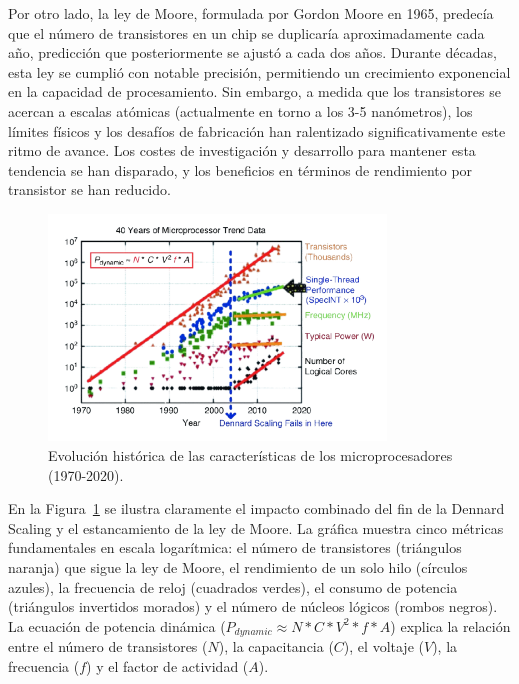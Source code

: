 \documentclass[11pt,spanish,listoffigures,listoftables]{tfgetsinf}
\begin{document}
Por otro lado, la ley de Moore, formulada por Gordon Moore en 1965, predecía que el número de transistores en un chip se duplicaría aproximadamente cada año, predicción que posteriormente se ajustó a cada dos años. Durante décadas, esta ley se cumplió con notable precisión, permitiendo un crecimiento exponencial en la capacidad de procesamiento. Sin embargo, a medida que los transistores se acercan a escalas atómicas (actualmente en torno a los 3-5 nanómetros), los límites físicos y los desafíos de fabricación han ralentizado significativamente este ritmo de avance. Los costes de investigación y desarrollo para mantener esta tendencia se han disparado, y los beneficios en términos de rendimiento por transistor se han reducido.

\begin{figure}[H]
   \centering
   \includegraphics[width=0.8\textwidth]{images/estado_del_arte/dennard_scaling.png}
   \caption{Evolución histórica de las características de los microprocesadores (1970-2020).}
   \label{fig:dennard_scaling}
\end{figure}

En la Figura~\ref{fig:dennard_scaling}\cite{DennardScaling} se ilustra claramente el impacto combinado del fin de la Dennard Scaling y el estancamiento de la ley de Moore. La gráfica muestra cinco métricas fundamentales en escala logarítmica: el número de transistores (triángulos naranja) que sigue la ley de Moore, el rendimiento de un solo hilo (círculos azules), la frecuencia de reloj (cuadrados verdes), el consumo de potencia (triángulos invertidos morados) y el número de núcleos lógicos (rombos negros). La ecuación de potencia dinámica ($P_{dynamic} \approx N * C * V^2 * f * A$) explica la relación entre el número de transistores ($N$), la capacitancia ($C$), el voltaje ($V$), la frecuencia ($f$) y el factor de actividad ($A$).
\end{document}
